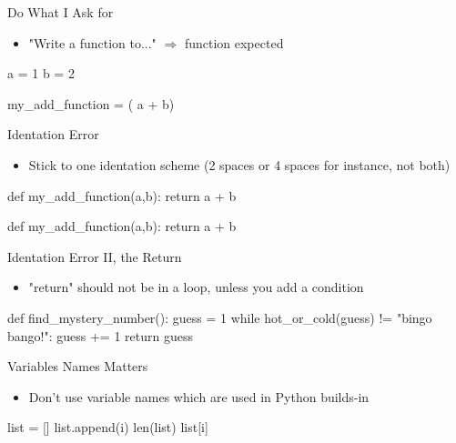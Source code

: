 \documentclass[serif, aspectratio=169]{beamer}
\begin{document}
\begin{frame}[fragile]{Do What I Ask for}
    \begin{itemize}
        \item "Write a function to..." $\Rightarrow$ function expected
    \end{itemize}
    \begin{pythoncode}
    a = 1
    b = 2

    my_add_function = ( a + b)
    \end{pythoncode}
\end{frame}

\begin{frame}[fragile]{Identation Error}
    \begin{itemize}
        \item Stick to one identation scheme (2 spaces or 4 spaces for instance, not both)
    \end{itemize}
    \begin{pythoncode}
    def my_add_function(a,b):
        return a + b

    def my_add_function(a,b):
      return a + b
    \end{pythoncode}
\end{frame}

\begin{frame}[fragile]{Identation Error II, the Return}
    \begin{itemize}
        \item "return" should not be in a loop, unless you add a condition 
    \end{itemize}
    \begin{pythoncode}
    def find_mystery_number():
        guess = 1
        while hot_or_cold(guess) != "bingo bango!":
            guess += 1 
            return guess
    \end{pythoncode}
\end{frame}

\begin{frame}[fragile]{Variables Names Matters}
    \begin{itemize}
        \item Don't use variable names which are used in Python builds-in
    \end{itemize}
    \begin{pythoncode}
    list = []
    list.append(i)
    len(list)
    list[i]
    \end{pythoncode}
\end{frame}
\end{document}
